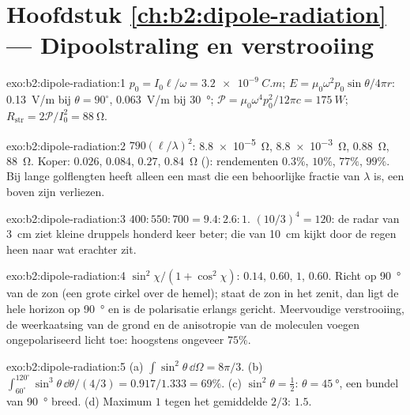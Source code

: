 \section*{Hoofdstuk \ref{ch:b2:dipole-radiation} --- Dipoolstraling en verstrooiing}

\begin{solution}{exo:b2:dipole-radiation:1}
$p_0 = I_0\ell/\omega = \qty{3.2e-9}{C.m}$;
$E = \mu_0\omega^2p_0\sin\theta/4\pi r$: \qty{0.13}{V/m} bij
$\theta = 90^\circ$, \qty{0.063}{V/m} bij \qty{30}{\degree};
$\mathcal P = \mu_0\omega^4p_0^2/12\pi c =
\qty{175}{W}$;
$R_{\text{str}} = 2\mathcal P/I_0^2 = \qty{88}{\ohm}$.
\end{solution}

\begin{solution}{exo:b2:dipole-radiation:2}
$790(\ell/\lambda)^2$: \qty{8.8e-5}{\ohm}, \qty{8.8e-3}{\ohm},
\qty{0.88}{\ohm}, \qty{88}{\ohm}. Koper: $0.026$, $0.084$, $0.27$,
\qty{0.84}{\ohm} (): rendementen $0.3\%$, $10\%$, $77\%$, $99\%$.
Bij lange golflengten heeft alleen een mast die een behoorlijke fractie van
$\lambda$ is, een  boven zijn verliezen.
\end{solution}

\begin{solution}{exo:b2:dipole-radiation:3}
$400 : 550 : 700 = 9.4 : 2.6 : 1$. $(10/3)^4 = 120$: de radar van
\qty{3}{cm} ziet kleine druppels honderd keer beter; die van \qty{10}{cm}
kijkt door de regen heen naar wat erachter zit.
\end{solution}

\begin{solution}{exo:b2:dipole-radiation:4}
$\sin^2\chi/(1 + \cos^2\chi)$: $0.14$, $0.60$, $1$, $0.60$. Richt op
\qty{90}{\degree} van de zon (een grote cirkel over de hemel); staat de zon
in het zenit, dan ligt de hele horizon op \qty{90}{\degree} en is de
polarisatie erlangs gericht. Meervoudige verstrooiing, de weerkaatsing van
de grond en de anisotropie van de moleculen voegen ongepolariseerd licht
toe: hoogstens ongeveer $75\%$.
\end{solution}

\begin{solution}{exo:b2:dipole-radiation:5}
(a) $\int\sin^2\theta\,\dd\Omega = 8\pi/3$. (b)
$\int_{60^\circ}^{120^\circ}\sin^3\theta\,\dd\theta/
(4/3) = 0.917/1.333 = 69\%$.
(c) $\sin^2\theta = \tfrac12$: $\theta = \qty{45}{\degree}$, een bundel van
\qty{90}{\degree} breed. (d) Maximum $1$ tegen het gemiddelde $2/3$: $1.5$.
\end{solution}

